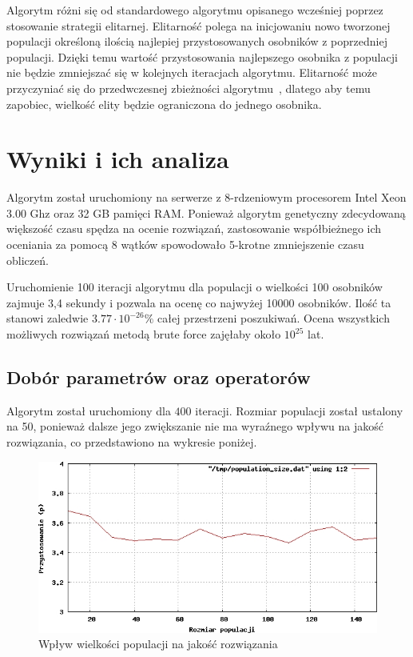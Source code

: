 \documentclass[brudnopis]{xmgr}
\begin{document}
Algorytm różni się od standardowego algorytmu opisanego wcześniej poprzez stosowanie strategii elitarnej. Elitarność polega na inicjowaniu nowo tworzonej populacji określoną ilością najlepiej przystosowanych osobników z poprzedniej populacji. Dzięki temu wartość przystosowania najlepszego osobnika z populacji nie będzie zmniejszać się w kolejnych iteracjach algorytmu. Elitarność może przyczyniać się do przedwczesnej zbieżności algorytmu~\cite{Luke2009Metaheuristics}, dlatego aby temu zapobiec, wielkość elity będzie ograniczona do jednego osobnika.


\chapter{Wyniki i ich analiza}

Algorytm został uruchomiony na serwerze z 8-rdzeniowym procesorem Intel Xeon 3.00 Ghz oraz 32 GB pamięci RAM. Ponieważ algorytm genetyczny zdecydowaną większość czasu spędza na ocenie rozwiązań, zastosowanie współbieżnego ich oceniania za pomocą 8 wątków spowodowało 5-krotne zmniejszenie czasu obliczeń.

Uruchomienie 100 iteracji algorytmu dla populacji o wielkości 100 osobników zajmuje 3,4 sekundy i pozwala na ocenę co najwyżej 10000 osobników. Ilość ta stanowi zaledwie $ 3.77 \cdot 10^{-26} \% $ całej przestrzeni poszukiwań. Ocena wszystkich możliwych rozwiązań metodą brute force zajęłaby około $ 10^{25} $ lat.

\section{Dobór parametrów oraz operatorów}

Algorytm został uruchomiony dla $400$ iteracji. Rozmiar populacji został ustalony na 50, ponieważ dalsze jego zwiększanie nie ma wyraźnego wpływu na jakość rozwiązania, co przedstawiono na wykresie poniżej.
\begin{figure}[!tbh]
\centering
\includegraphics[width=.8\hsize]{fig/population_size}
\caption{Wpływ wielkości populacji na jakość rozwiązania}
\end{figure}
\end{document}
